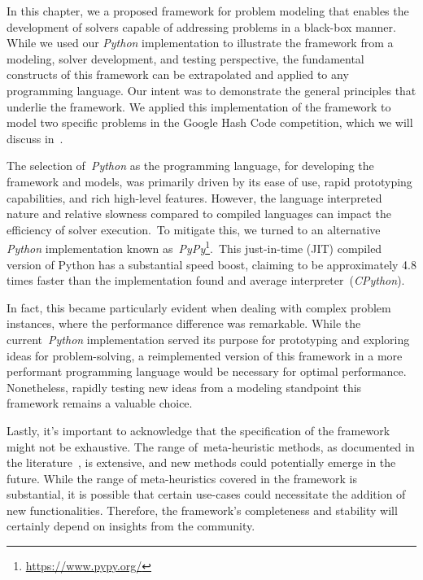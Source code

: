 In this chapter, we a proposed framework for problem modeling that enables the
development of solvers capable of addressing problems in a black-box manner.
While we used our \emph{Python} implementation to illustrate the framework from
a modeling, solver development, and testing perspective, the fundamental
constructs of this framework can be extrapolated and applied to any programming
language. Our intent was to demonstrate the general principles that underlie the
framework. We applied this implementation of the framework to model two specific
problems in the Google Hash Code competition, which we will discuss
in~.

The selection of~\emph{Python} as the programming language, for developing the
framework and models, was primarily driven by its ease of use, rapid prototyping
capabilities, and rich high-level features. However, the language interpreted
nature and relative slowness compared to compiled languages can impact the
efficiency of solver execution.~To mitigate this, we turned to an alternative
\emph{Python} implementation known as~\emph{PyPy}\footnote{\url{https://www.pypy.org/}}.~This just-in-time (JIT) compiled
version of Python has a substantial speed boost, claiming to be approximately
4.8 times faster than the implementation found and average interpreter~(\emph{CPython}).

In fact, this became particularly evident when dealing with complex problem
instances, where the performance difference was remarkable. While the
current~\emph{Python} implementation served its purpose for prototyping and
exploring ideas for problem-solving, a reimplemented version of this framework
in a more performant programming language would be necessary for optimal
performance. Nonetheless, rapidly testing new ideas from a modeling standpoint
this framework remains a valuable choice.

Lastly, it's important to acknowledge that the specification of the framework
might not be exhaustive. The range of~\acrshort{meta-heuristic} methods, as
documented in the literature~\cite{osman1996metaheuristics}, is extensive, and
new methods could potentially emerge in the future. While the range of
meta-heuristics covered in the framework is substantial, it is possible that
certain use-cases could necessitate the addition of new functionalities.
Therefore, the framework's completeness and stability will certainly depend on
insights from the community.